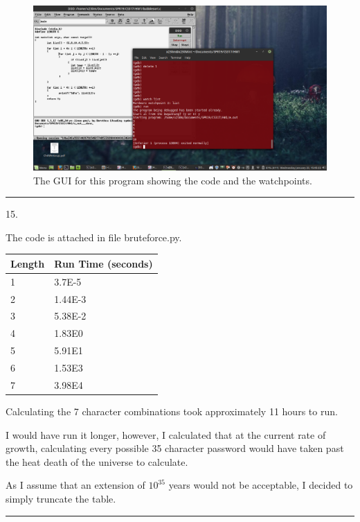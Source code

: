 \documentclass{article}
\begin{document}
\begin{figure}[H]

  \includegraphics[scale=0.4]{P15-full}
  \caption{The GUI for this program showing the code and the watchpoints. }
\end{figure}



\noindent\rule{8cm}{0.4pt}


15. 

The code is attached in file bruteforce.py. 



\begin{table}[H]
\begin{tabular}{|l|l|}
\hline
Length & Run Time (seconds) \\ \hline
1 & 3.7E-5 \\ \hline
2 & 1.44E-3 \\ \hline
3 & 5.38E-2 \\ \hline
4 & 1.83E0 \\ \hline
5 & 5.91E1 \\ \hline
6 & 1.53E3 \\ \hline
7 & 3.98E4 \\ \hline
\end{tabular}
\end{table}

Calculating the 7 character combinations took approximately 11 hours to run.

I would have run it longer, however, I calculated that at the current rate of growth, calculating every possible 35 character password would have taken past the heat death of the universe to calculate. 

As I assume that an extension of $10^{35}$ years would not be acceptable, I decided to simply truncate the table. 



\noindent\rule{8cm}{0.4pt}
\end{document}
